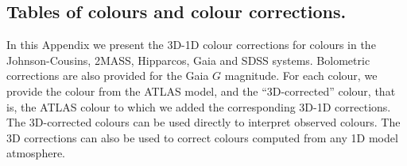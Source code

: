 \documentclass[]{aa}
\begin{document}
\begin{appendix}

\section{Tables of colours and colour corrections.}

In this Appendix we present the 3D-1D colour corrections for colours
in the Johnson-Cousins, 2MASS, Hipparcos, Gaia and SDSS systems.
Bolometric corrections are also provided for the Gaia $G$ magnitude.
For each colour, we provide the colour from the ATLAS model, and the ``3D-corrected'' colour, that is, the ATLAS colour to which we added
the corresponding 3D-1D corrections. 
The 3D-corrected colours can be used directly to interpret observed colours. 
The 3D corrections can also be used to correct colours computed from any
1D model atmosphere.  


\end{appendix}
\end{document}
